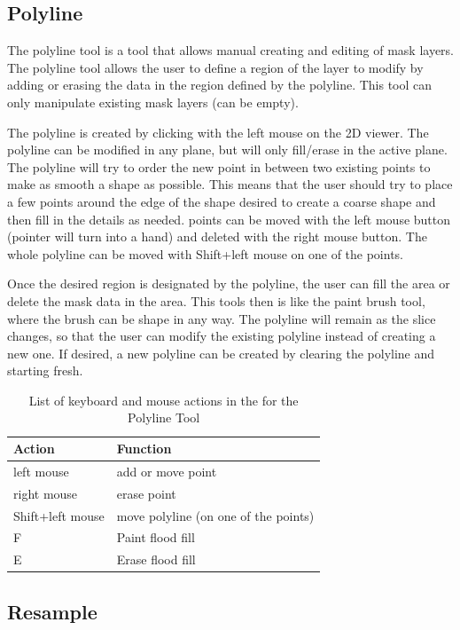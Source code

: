 \documentclass[fleqn,11pt,openany]{book}
\begin{document}
\subsection{Polyline}

The polyline tool is a tool that allows manual creating and editing of mask layers.  The polyline tool allows the user to define a region of the layer to modify by adding or erasing the data in the region defined by the polyline.  This tool can only manipulate existing mask layers (can be empty).  

The polyline is created by clicking with the left mouse on the 2D viewer.  The polyline can be modified in any plane, but will only fill/erase in the active plane.   The polyline will try to order the new point in between two existing points to make as smooth a shape as possible.  This means that the user should try to place a few points around the edge of the shape desired to create a coarse shape and then fill in the details as needed.  points can be moved with the left mouse button (pointer will turn into a hand) and deleted with the right mouse button.  The whole polyline can be moved with Shift+left mouse on one of the points.  

Once the desired region is designated by the polyline, the user can fill the area or delete the mask data in the area.  This tools then is like the paint brush tool, where the brush can be shape in any way.  The polyline will remain as the slice changes, so that the user can modify the existing polyline instead of creating a new one.  If desired, a new polyline can be created by clearing the polyline and starting fresh.  


\begin{table}[h!]
\label{tab:polylinekey}
\caption{List of keyboard and mouse actions in the for the Polyline Tool}
\begin{tabular}{|l|l|}
\hline
{\bf Action} & {\bf Function}\\
\hline 
left mouse & add or move point \\
\hline
right mouse & erase point\\
\hline
Shift+left mouse & move polyline (on one of the points)\\
\hline
F & Paint flood fill\\
\hline
E & Erase flood fill\\ 
\hline
\end{tabular}
\end{table}

\subsection{Resample}
\end{document}
